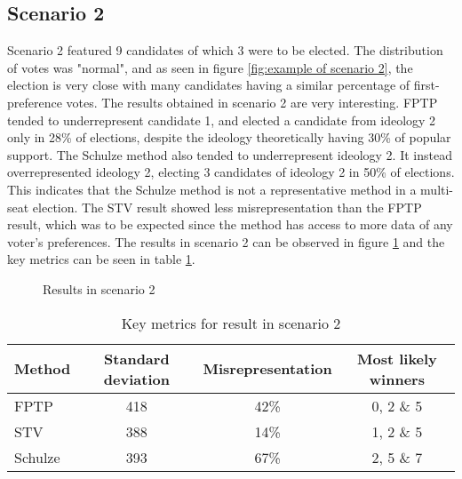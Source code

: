 \documentclass[12pt]{article}
\begin{document}
\subsection{Scenario 2}
Scenario 2 featured 9 candidates of which 3 were to be elected. The distribution of votes was "normal", and as seen in figure \ref{fig:example of scenario 2}, the election is very close with many candidates having a similar percentage of first-preference votes. The results obtained in scenario 2 are very interesting. FPTP tended to underrepresent candidate 1, and elected a candidate from ideology 2 only in 28\% of elections, despite the ideology theoretically having 30\% of popular support. The Schulze method also tended to underrepresent ideology 2. It instead overrepresented ideology 2, electing 3 candidates of ideology 2 in 50\% of elections. This indicates that the Schulze method is not a representative method in a multi-seat election. The STV result showed less misrepresentation than the FPTP result, which was to be expected since the method has access to more data of any voter's preferences. The results in scenario 2 can be observed in figure \ref{fig:scenario 2 result} and the key metrics can be seen in table \ref{tab:scenario 2 result}.
\begin{figure}
	\centering
	\caption{Results in scenario 2}
	\label{fig:scenario 2 result}
\end{figure}

\begin{table}
\centering
\caption{Key metrics for result in scenario 2}
\label{tab:scenario 2 result}
\begin{tabular}{@{}lccc@{}}
\toprule
Method & Standard deviation & Misrepresentation & Most likely winners \\ \midrule
FPTP & 418 & 42\% & 0, 2 \& 5 \\
STV & 388 & 14\% & 1, 2 \& 5 \\
Schulze & 393 & 67\% & 2, 5 \& 7  \\ \bottomrule
\end{tabular}
\end{table}
\end{document}
